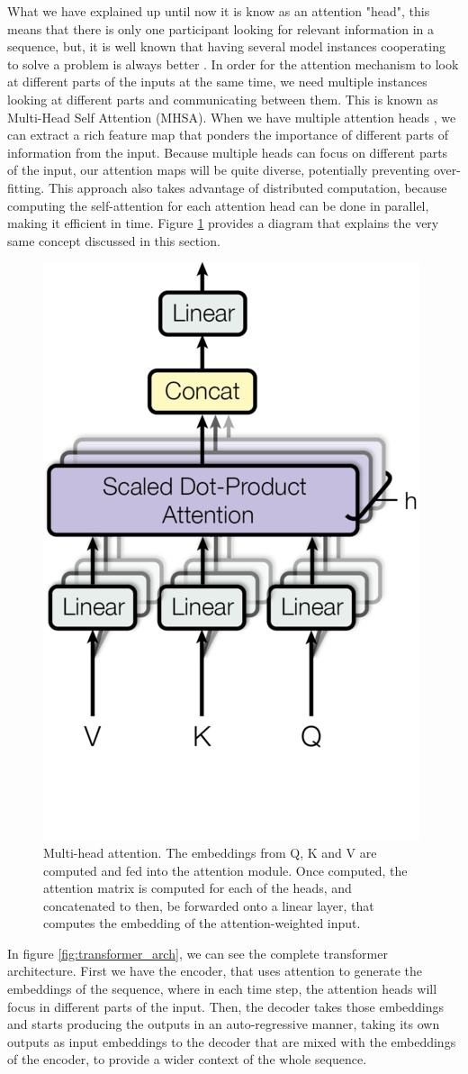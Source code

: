 What we have explained up until now it is know as an attention "head", this means that there is only one participant looking for relevant information in a sequence, but, it is well known that having several model instances cooperating to solve a problem is always better \cite{model_emsembling_survey}. In order for the attention mechanism to look at different parts of the inputs at the same time, we need multiple instances looking at different parts and communicating between them. This is known as Multi-Head Self Attention (MHSA). When we have multiple attention heads \cite{vaswani2023attention}, we can extract a rich feature map that ponders the importance of different parts of information from the input. Because multiple heads can focus on different parts of the input, our attention maps will be quite diverse, potentially preventing over-fitting. This approach also takes advantage of distributed computation, because computing the self-attention for each attention head can be done in parallel, making it efficient in time. Figure \ref{fig:multihead_attn} provides a diagram that explains the very same concept discussed in this section.

\begin{figure}[!h]
	\centering
	\includegraphics[width=0.25\linewidth]{figures/multi_head_attn.png}
	\caption{Multi-head attention. The embeddings from Q, K and V are computed and fed into the attention module. Once computed, the attention matrix is computed for each of the heads, and concatenated to then, be forwarded onto a linear layer, that computes the embedding of the attention-weighted input.}
	\label{fig:multihead_attn}
\end{figure} 

In figure \ref{fig:transformer_arch}, we can see the complete transformer architecture. First we have the encoder, that uses attention to generate the embeddings of the sequence, where in each time step, the attention heads will focus in different parts of the input. Then, the decoder takes those embeddings and starts producing the outputs in an auto-regressive manner, taking its own outputs as input embeddings to the decoder that are mixed with the embeddings of the encoder, to provide a wider context of the whole sequence.

